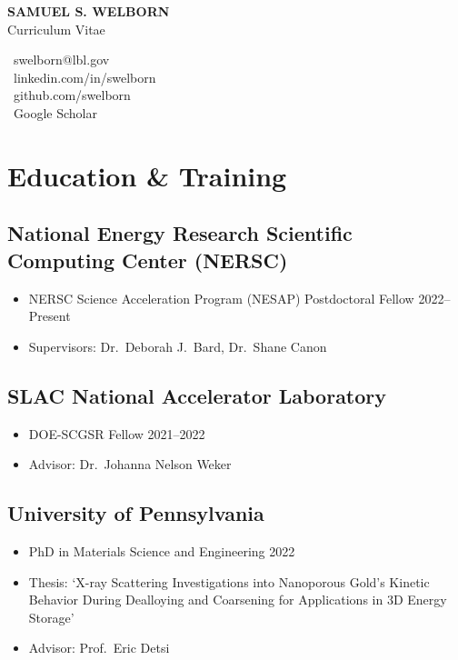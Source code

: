 \documentclass[11pt]{article} %
\begin{document}
\begin{center}
  \begin{minipage}{0.5\textwidth}
    {\LARGE\bfseries
      SAMUEL S. WELBORN
    } \\ \medskip
    Curriculum Vitae
  \end{minipage} \hfill
  \begin{minipage}{0.4\textwidth}
    \raggedleft
    {\faEnvelope} \ {swelborn@lbl.gov} \\
    \href{https://www.linkedin.com/in/swelborn}{\faLinkedin} \ linkedin.com/in/swelborn \\
    \href{https://github.com/swelborn}{\faGithub} \ github.com/swelborn \\
    \href{https://scholar.google.com/citations?user=WsQfglgAAAAJ&hl=en&authuser=1}{\faGraduationCap} \ Google Scholar
  \end{minipage}
\end{center}

\section{Education \& Training}
\subsection{National Energy Research Scientific Computing Center (NERSC)}
\begin{itemize}
  \item NERSC Science Acceleration Program (NESAP) Postdoctoral Fellow \hfill 2022--Present
  \item Supervisors: Dr.\ Deborah J.\ Bard, Dr.\ Shane Canon
\end{itemize}

\subsection{SLAC National Accelerator Laboratory}
\begin{itemize}
  \item DOE-SCGSR Fellow \hfill 2021--2022
  \item Advisor: Dr.\ Johanna Nelson Weker
\end{itemize}

\subsection{University of Pennsylvania}
\begin{itemize}
  \item PhD in Materials Science and Engineering \hfill 2022
  \item Thesis: `X-ray Scattering Investigations into Nanoporous Gold's Kinetic Behavior During Dealloying and Coarsening for Applications in 3D Energy Storage'
  \item Advisor: Prof.\ Eric Detsi
\end{itemize}
\end{document}
